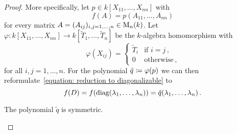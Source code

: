 \begin{proof}
  More specifically, let $p \in k[X_{11}, \dotsc, X_{nn}]$ with
  \[
      f(A)
    = p(A_{11}, \dotsc, A_{nn})
  \]
  for every matrix $A = (A_{ij})_{i,j=1,\dotsc,n} \in \operatorname{M}_n(k)$.
  Let $\varphi \colon k[X_{11}, \dotsc, X_{nn}] \to k[\tilde{T}_1, \dotsc, \tilde{T}_n]$ be the $k$-algebra homomorphism with
  \[
      \varphi(X_{ij})
    = \begin{cases}
        \tilde{T}_i & \text{if $i = j$} \,, \\
                  0 & \text{otherwise}  \,,
      \end{cases}
  \]
  for all $i,j = 1, \dotsc, n$.
  For the polynomial $\tilde{q} \coloneqq \varphi(p)$ we can then reformulate~\eqref{equation: reduction to diagonalizable} to
  \begin{equation}
    \label{equation: reduction to diagonalizable second}
      f(D)
    = f(\operatorname{diag}(\lambda_1, \dotsc, \lambda_n))
    = \tilde{q}(\lambda_1, \dotsc, \lambda_n) \,.
  \end{equation}
  
  \begin{claim}
    The polynomial $\tilde{q}$ is symmetric.
  \end{claim}
    

\end{proof}
